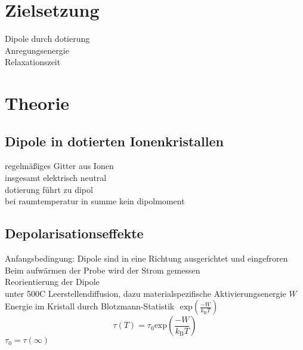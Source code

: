 \section{Zielsetzung}
Dipole durch dotierung\\
Anregungsenergie\\
Relaxationszeit

\section{Theorie}
	\subsection{Dipole in dotierten Ionenkristallen}
		regelmäßiges Gitter aus Ionen\\
		insgesamt elektrisch neutral\\
		dotierung führt zu dipol\\
		bei raumtemperatur in summe kein dipolmoment\\

	\subsection{Depolarisationseffekte}
		Anfangsbedingung: Dipole sind in eine Richtung ausgerichtet und eingefroren\\
		Beim aufwärmen der Probe wird der Strom gemessen\\
		Reorientierung der Dipole\\
		unter 500C Leerstellendiffusion, dazu materialspezifische Aktivierungsenergie $W$\\
		Energie im Kristall durch Blotzmann-Statistik $\text{~exp}\left(\frac{-W}{k_\text{B}T}\right)$\\
		\begin{equation}
			\tau(T) = \tau_0 \text{exp}\left(\frac{-W}{k_\text{B}T}\right)
		\end{equation}
		$\tau_0 = \tau(\infty)$

